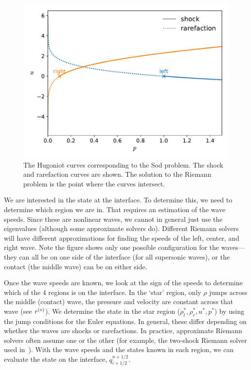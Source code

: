\begin{figure}[t]
\centering
\includegraphics[width=0.8\linewidth]{riemann-phase}
\caption{\label{fig:euler:riemann-curve} The Hugoniot curves corresponding
to the Sod problem.  The shock and rarefaction curves are shown.  The
solution to the Riemann problem is the point where the curves intersect.}
\end{figure}

We are interested in the state at the interface.  To
determine this, we need to determine which region we are in.  That
requires an estimation of the wave speeds.  Since these are nonlinear
waves, we cannot in general just use the eigenvalues (although some
approximate solvers do).  Different Riemann solvers will have
different approximations for finding the speeds of the left, center,
and right wave.  Note the figure shows only one possible configuration
for the waves---they can all be on one side of the interface (for
all supersonic waves), or the contact (the middle wave) can be on either
side.

Once the wave speeds are known, we look at the sign of the speeds to
determine which of the 4 regions is on the interface.  In the `star'
region, only $\rho$ jumps across the middle (contact) wave, the
pressure and velocity are constant across that wave (see $r^{(\circ)}$).
We determine the state in the star region ($\rho_l^*, \rho_r^*, u^*,
p^*$) by using the jump conditions for the Euler equations.  In
general, these differ depending on whether the waves are shocks or
rarefactions.  In practice, approximate Riemann solvers often assume
one or the other (for example, the two-shock Riemann solver used
in~\cite{colellaglaz:1985}).  With the wave speeds and the states
known in each region, we can evaluate the state on the interface,
$q_{i+1/2}^{n+1/2}$.

